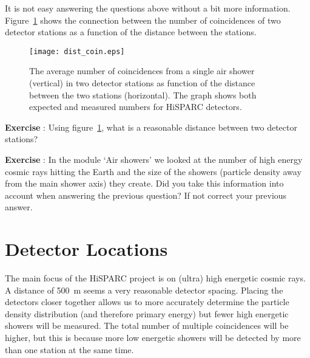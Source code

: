 \documentclass[12pt,a4paper]{article}
\numberwithin{equation}{section}
\numberwithin{figure}{section}
\newcounter{Exercise}
\numberwithin{table}{section}
\begin{document}
It is not easy answering the questions above without a bit more information. Figure~\ref{fig:dist_coin} shows the connection between the number of coincidences of two detector stations as a function of the distance between the stations.

\begin{figure}\begin{center}
\texttt{[image: dist\_coin.eps]}
\caption{The average number of coincidences from a single air shower (vertical) in two detector stations as function of the distance between the two stations (horizontal). The graph shows both expected and measured numbers for HiSPARC detectors.\protect\footnotemark }\label{fig:dist_coin}
\end{center}\end{figure}

\begin{shaded}
\textbf{Exercise \theExercise {}} : Using figure~\ref{fig:dist_coin}, what is a reasonable distance between two detector stations? \end{shaded}

\begin{shaded}
\textbf{Exercise \theExercise {}} : In the module `Air showers' we looked at the number of high energy cosmic rays hitting the Earth and the size of the showers (particle density away from the main shower axis) they create. Did you take this information into account when answering the previous question? If not correct your previous answer.
\end{shaded}

\section{Detector Locations}
The main focus of the HiSPARC project is on (ultra) high energetic cosmic rays.  A distance of 500~m seems a very reasonable detector spacing. Placing the detectors closer together allows us to more accurately determine the particle density distribution (and therefore primary energy) but fewer high energetic showers will be measured. The total number of multiple coincidences will be higher, but this is because more low energetic showers will be detected by more than one station at the same time.
\end{document}
